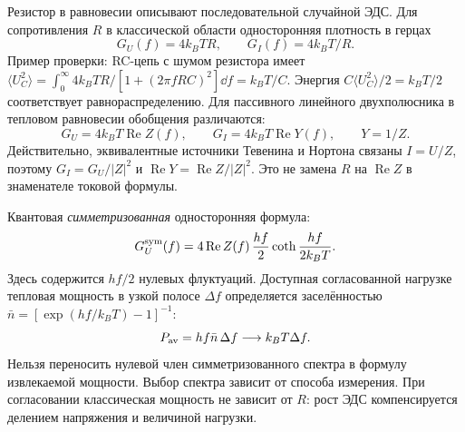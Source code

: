 
Резистор в равновесии описывают последовательной случайной ЭДС. Для сопротивления $R$ в классической области односторонняя плотность в герцах
\begin{equation}
 G_U(f)=4k_BTR,\qquad G_I(f)=4k_BT/R.
\end{equation}
Пример проверки: RC-цепь с шумом резистора имеет $\langle U_C^2\rangle=\int_0^\infty4k_BTR/[1+(2\pi fRC)^2]\dd f=k_BT/C$. Энергия $C\langle U_C^2\rangle/2=k_BT/2$ соответствует равнораспределению. Для пассивного линейного двухполюсника в тепловом равновесии обобщения различаются:
\begin{equation}\label{eq:nyquistZY}
 G_U=4k_BT\operatorname{Re}Z(f),\qquad
 G_I=4k_BT\operatorname{Re}Y(f),\qquad Y=1/Z.
\end{equation}
Действительно, эквивалентные источники Тевенина и Нортона связаны $I=U/Z$, поэтому $G_I=G_U/|Z|^2$ и $\operatorname{Re}Y=\operatorname{Re}Z/|Z|^2$. Это не замена $R$ на $\operatorname{Re}Z$ в знаменателе токовой формулы.

Квантовая \emph{симметризованная} односторонняя формула:
\begin{equation}
 G_U^{\rm sym}(f)=4\operatorname{Re}Z(f)\,
 \frac{hf}{2}\coth\frac{hf}{2k_BT}.
\end{equation}
Здесь содержится $hf/2$ нулевых флуктуаций. Доступная согласованной нагрузке тепловая мощность в узкой полосе $\Delta f$ определяется заселённостью $\bar n=[\exp(hf/k_BT)-1]^{-1}$:
\begin{equation}
 P_{\rm av}=hf\bar n\,\Delta f\longrightarrow k_BT\Delta f.
\end{equation}
Нельзя переносить нулевой член симметризованного спектра в формулу извлекаемой мощности. Выбор спектра зависит от способа измерения. При согласовании классическая мощность не зависит от $R$: рост ЭДС компенсируется делением напряжения и величиной нагрузки.
